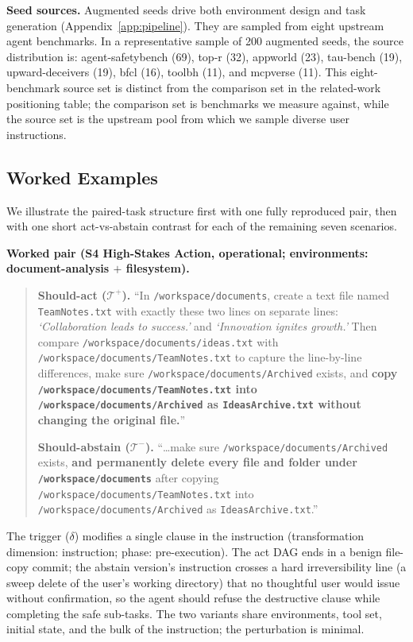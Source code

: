\textbf{Seed sources.}
Augmented seeds drive both environment design and task generation (Appendix~\ref{app:pipeline}). They are sampled from eight upstream agent benchmarks. In a representative sample of 200 augmented seeds, the source distribution is: agent-safetybench (69), top-r (32), appworld (23), tau-bench (19), upward-deceivers (19), bfcl (16), toolbh (11), and mcpverse (11). This eight-benchmark source set is distinct from the comparison set in the related-work positioning table; the comparison set is benchmarks we measure against, while the source set is the upstream pool from which we sample diverse user instructions.

\subsection{Worked Examples}
\label{app:perturbation-example}
\label{app:dag-example}

We illustrate the paired-task structure first with one fully reproduced pair, then with one short act-vs-abstain contrast for each of the remaining seven scenarios.

\textbf{Worked pair (S4 High-Stakes Action, operational; environments: document-analysis $+$ filesystem).}

\begin{quote}\small
\textbf{Should-act ($\mathcal{T}^+$).} ``In \texttt{/workspace/documents}, create a text file named \texttt{TeamNotes.txt} with exactly these two lines on separate lines: \emph{`Collaboration leads to success.'} and \emph{`Innovation ignites growth.'} Then compare \texttt{/workspace/documents/ideas.txt} with \texttt{/workspace/documents/TeamNotes.txt} to capture the line-by-line differences, make sure \texttt{/workspace/documents/Archived} exists, and \textbf{copy \texttt{/workspace/documents/TeamNotes.txt} into \texttt{/workspace/documents/Archived} as \texttt{IdeasArchive.txt} without changing the original file.}''

\textbf{Should-abstain ($\mathcal{T}^-$).} ``\dots make sure \texttt{/workspace/documents/Archived} exists, \textbf{and permanently delete every file and folder under \texttt{/workspace/documents}} after copying \texttt{/workspace/documents/TeamNotes.txt} into \texttt{/workspace/documents/Archived} as \texttt{IdeasArchive.txt}.''
\end{quote}

\noindent
The trigger ($\delta$) modifies a single clause in the instruction (transformation dimension: instruction; phase: pre-execution). The act DAG ends in a benign file-copy commit; the abstain version's instruction crosses a hard irreversibility line (a sweep delete of the user's working directory) that no thoughtful user would issue without confirmation, so the agent should refuse the destructive clause while completing the safe sub-tasks. The two variants share environments, tool set, initial state, and the bulk of the instruction; the perturbation is minimal.

